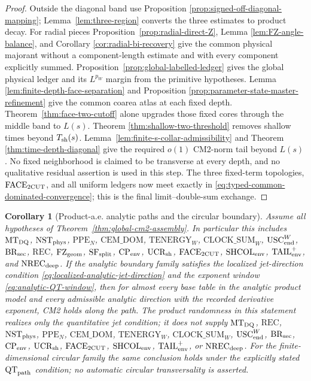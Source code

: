 \documentclass[11pt]{article}
\newtheorem{corollary}[theorem]{Corollary}
\begin{document}
\begin{proof}
Outside the diagonal band use Proposition
\ref{prop:signed-off-diagonal-mapping};
Lemma~\ref{lem:three-region} converts the three estimates to product decay.
For radial pieces Proposition~\ref{prop:radial-direct-Z}, Lemma
\ref{lem:FZ-angle-balance}, and Corollary
\ref{cor:radial-bi-recovery} give the common physical majorant without a
component-length estimate and with every component explicitly summed.
Proposition~\ref{prop:global-labelled-ledger} gives the global physical
ledger and its $L^{p_W}$ margin from the primitive hypotheses.  Lemma
\ref{lem:finite-depth-face-separation} and Proposition
\ref{prop:parameter-state-master-refinement} give the common coarea atlas at
each fixed depth.  Theorem~\ref{thm:face-two-cutoff} alone upgrades those
fixed cores through the middle band to $L(s)$.  Theorem
\ref{thm:shallow-two-threshold} removes shallow times beyond
$T_{\rm sh}(s)$.  Lemma~\ref{lem:finite-s-collar-admissibility} and Theorem
\ref{thm:time-depth-diagonal} give the required $o(1)$ CM2-norm tail beyond
$L(s)$.  No fixed neighborhood is
claimed to be transverse at every depth, and no qualitative residual
assertion is used in this step.  The three fixed-term topologies,
$\mathrm{FACE}_{\rm 2CUT}$, and all uniform ledgers now meet exactly in
\eqref{eq:typed-common-dominated-convergence}; this is the final
limit--double-sum exchange.
\end{proof}

\begin{corollary}[Product-a.e. analytic paths and the circular boundary]
\label{cor:analytic-pathwise-CM2}
Assume all hypotheses of Theorem~\ref{thm:global-cm2-assembly}.  In
particular this includes $\mathrm{MT}_{\rm DQ}$,
$\mathrm{NST}_{\rm phys}$, $\mathrm{PPE}_{N}$,
$\mathrm{CEM\_DOM}$, $\mathrm{TENERGY}_{W}$,
$\mathrm{CLOCK\_SUM}_{W}$,
$\mathrm{USC}_{\rm end}^{W}$,
$\mathrm{BR}_{\rm sec}$,
$\mathrm{REC}$, $\mathrm{FZ}_{\rm geom}$, $\mathrm{SF}_{\rm split}$,
$\mathrm{CP}_{\rm env}$, $\mathrm{UCR}_{\rm sh}$,
$\mathrm{FACE}_{\rm 2CUT}$,
$\mathrm{SHCOL}_{\rm env}$, $\mathrm{TAIL}_{\rm env}^{+}$, and
$\mathrm{NREC}_{\rm deep}$.  If the analytic boundary family
satisfies the localized jet-direction condition
\eqref{eq:localized-analytic-jet-direction} and the exponent window
\eqref{eq:analytic-QT-window}, then for almost every base table in the
analytic product model and every admissible analytic direction with the
recorded derivative exponent, CM2 holds along the path.
The product randomness in this statement realizes only the quantitative jet
condition; it does not supply $\mathrm{MT}_{\rm DQ}$,
$\mathrm{REC}$,
$\mathrm{NST}_{\rm phys}$, $\mathrm{PPE}_{N}$,
$\mathrm{CEM\_DOM}$, $\mathrm{TENERGY}_{W}$,
$\mathrm{CLOCK\_SUM}_{W}$,
$\mathrm{USC}_{\rm end}^{W}$,
$\mathrm{BR}_{\rm sec}$,
$\mathrm{CP}_{\rm env}$, $\mathrm{UCR}_{\rm sh}$,
$\mathrm{FACE}_{\rm 2CUT}$,
$\mathrm{SHCOL}_{\rm env}$, $\mathrm{TAIL}_{\rm env}^{+}$, or
$\mathrm{NREC}_{\rm deep}$.
For the finite-dimensional circular family the same conclusion holds under
the explicitly stated $\mathrm{QT}_{\rm path}$ condition; no automatic
circular transversality is asserted.
\end{corollary}
\end{document}
